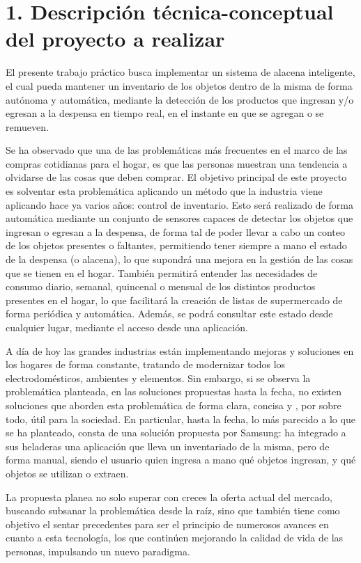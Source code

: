 \documentclass[
11pt, %
codirector, %
]{charter}
\begin{document}
\section{1. Descripción técnica-conceptual del proyecto a realizar}
\label{sec:descripcion}



El presente trabajo práctico busca implementar un sistema de alacena inteligente, el cual pueda mantener un inventario de los objetos dentro de la misma de forma autónoma y automática, mediante la detección de los productos que ingresan y/o egresan a la despensa en tiempo real, en el instante en que se agregan o se remueven.

Se ha observado que  una de las problemáticas más frecuentes en el marco de las compras cotidianas para el hogar, es que las personas muestran una tendencia a olvidarse de las cosas que deben comprar. El objetivo principal de este proyecto es solventar esta problemática aplicando un método que la industria viene aplicando hace ya varios años: control de inventario. Esto será realizado de forma automática mediante un conjunto de sensores capaces de detectar los objetos que ingresan o egresan a la despensa, de forma tal de poder llevar a cabo un conteo de los objetos presentes o faltantes, permitiendo tener siempre a mano el estado de la despensa (o alacena), lo que supondrá una mejora en la gestión de las cosas que se tienen en el hogar. También permitirá entender las necesidades de consumo diario, semanal, quincenal o mensual de los distintos productos presentes en el hogar, lo que facilitará la creación de listas de supermercado de forma periódica y automática. Además, se podrá consultar este estado desde cualquier lugar, mediante el acceso desde una aplicación. 

A día de hoy las grandes industrias están implementando mejoras y soluciones en los hogares de forma constante, tratando de modernizar todos los electrodomésticos, ambientes y elementos. Sin embargo, si se observa la problemática planteada, en las soluciones propuestas hasta la fecha, no existen soluciones que aborden esta problemática de forma clara, concisa y , por sobre todo, útil para la sociedad. En particular, hasta la fecha, lo más parecido a lo que se ha planteado, consta de una solución propuesta por Samsung: ha integrado a sus heladeras una aplicación que lleva un inventariado de la misma, pero de forma manual, siendo el usuario quien ingresa a mano qué objetos ingresan, y qué objetos se utilizan o extraen.

La propuesta planea no solo superar con creces la oferta actual del mercado, buscando subsanar la problemática desde la raíz, sino que también tiene como objetivo el sentar precedentes para ser el principio de numerosos avances en cuanto a esta tecnología, los que continúen mejorando la calidad de vida de las personas, impulsando un nuevo paradigma. 
\end{document}
